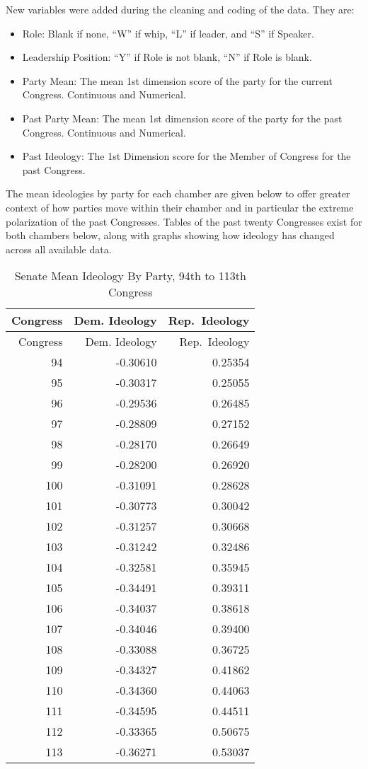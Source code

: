 \documentclass[12pt,twoside]{reedthesis}
\begin{document}
  New variables were added during the cleaning and coding of the data.
  They are:
  
  \begin{itemize}
  \itemsep1pt\parskip0pt
  \item
    Role: Blank if none, ``W'' if whip, ``L'' if leader, and ``S'' if
    Speaker.
  \item
    Leadership Position: ``Y'' if Role is not blank, ``N'' if Role is
    blank.
  \item
    Party Mean: The mean 1st dimension score of the party for the current
    Congress. Continuous and Numerical.
  \item
    Past Party Mean: The mean 1st dimension score of the party for the
    past Congress. Continuous and Numerical.
  \item
    Past Ideology: The 1st Dimension score for the Member of Congress for
    the past Congress.
  \end{itemize}
  
  The mean ideologies by party for each chamber are given below to offer
  greater context of how parties move within their chamber and in
  particular the extreme polarization of the past Congresses. Tables of
  the past twenty Congresses exist for both chambers below, along with
  graphs showing how ideology has changed across all available data.
  
  \newpage
  
  \begin{longtable}[c]{@{}rrr@{}}
  \caption{Senate Mean Ideology By Party, 94th to 113th
  Congress}\tabularnewline
  \toprule
  Congress & Dem. Ideology & Rep.~Ideology\tabularnewline
  \midrule
  \endfirsthead
  \toprule
  Congress & Dem. Ideology & Rep.~Ideology\tabularnewline
  \midrule
  \endhead
  94 & -0.30610 & 0.25354\tabularnewline
  95 & -0.30317 & 0.25055\tabularnewline
  96 & -0.29536 & 0.26485\tabularnewline
  97 & -0.28809 & 0.27152\tabularnewline
  98 & -0.28170 & 0.26649\tabularnewline
  99 & -0.28200 & 0.26920\tabularnewline
  100 & -0.31091 & 0.28628\tabularnewline
  101 & -0.30773 & 0.30042\tabularnewline
  102 & -0.31257 & 0.30668\tabularnewline
  103 & -0.31242 & 0.32486\tabularnewline
  104 & -0.32581 & 0.35945\tabularnewline
  105 & -0.34491 & 0.39311\tabularnewline
  106 & -0.34037 & 0.38618\tabularnewline
  107 & -0.34046 & 0.39400\tabularnewline
  108 & -0.33088 & 0.36725\tabularnewline
  109 & -0.34327 & 0.41862\tabularnewline
  110 & -0.34360 & 0.44063\tabularnewline
  111 & -0.34595 & 0.44511\tabularnewline
  112 & -0.33365 & 0.50675\tabularnewline
  113 & -0.36271 & 0.53037\tabularnewline
  \bottomrule
  \end{longtable}
  
\end{document}
